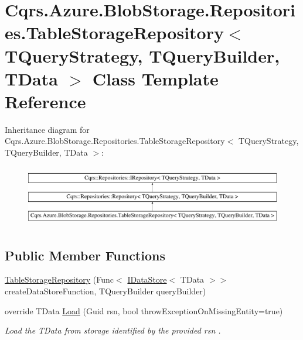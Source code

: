 \hypertarget{classCqrs_1_1Azure_1_1BlobStorage_1_1Repositories_1_1TableStorageRepository}{}\section{Cqrs.\+Azure.\+Blob\+Storage.\+Repositories.\+Table\+Storage\+Repository$<$ T\+Query\+Strategy, T\+Query\+Builder, T\+Data $>$ Class Template Reference}
\label{classCqrs_1_1Azure_1_1BlobStorage_1_1Repositories_1_1TableStorageRepository}
Inheritance diagram for Cqrs.\+Azure.\+Blob\+Storage.\+Repositories.\+Table\+Storage\+Repository$<$ T\+Query\+Strategy, T\+Query\+Builder, T\+Data $>$\+:\begin{figure}[H]
\begin{center}
\leavevmode
\includegraphics[height=2.722852cm]{classCqrs_1_1Azure_1_1BlobStorage_1_1Repositories_1_1TableStorageRepository}
\end{center}
\end{figure}
\subsection*{Public Member Functions}
\begin{DoxyCompactItemize}
\item 
\hyperlink{classCqrs_1_1Azure_1_1BlobStorage_1_1Repositories_1_1TableStorageRepository_a2c98507c1cdd4ed740a8d881a4e779e1_a2c98507c1cdd4ed740a8d881a4e779e1}{Table\+Storage\+Repository} (Func$<$ \hyperlink{interfaceCqrs_1_1DataStores_1_1IDataStore}{I\+Data\+Store}$<$ T\+Data $>$$>$ create\+Data\+Store\+Function, T\+Query\+Builder query\+Builder)
\item 
override T\+Data \hyperlink{classCqrs_1_1Azure_1_1BlobStorage_1_1Repositories_1_1TableStorageRepository_a7238452f19c9d51b5733df7701920605_a7238452f19c9d51b5733df7701920605}{Load} (Guid rsn, bool throw\+Exception\+On\+Missing\+Entity=true)
\begin{DoxyCompactList}\small\item\em Load the {\itshape T\+Data}  from storage identified by the provided {\itshape rsn} . \end{DoxyCompactList}\end{DoxyCompactItemize}
